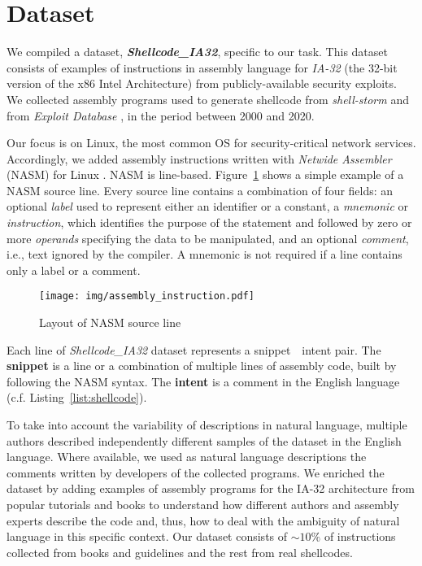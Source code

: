 \documentclass[11pt,a4paper]{article}
\newcommand{\datasetname}[1]{\emph{Shellcode\_IA32}}
\begin{document}
 
\section{Dataset}
\label{sec:dataset}
We compiled a dataset, \textbf{\datasetname{}}, specific to our task. This dataset consists of  examples of instructions in assembly language for \textit{IA-32} (the 32-bit version of the x86 Intel Architecture) from publicly-available security exploits. We collected assembly programs used to generate shellcode from \textit{shell-storm} \cite{shellstorm} and from \textit{Exploit Database} \cite{exploitdb}, in the period between 2000 and 2020.



Our focus is on Linux, the most common OS for security-critical network services. Accordingly, we added assembly instructions written with \textit{Netwide Assembler} (NASM) for Linux \cite{duntemann2000assembly}.
NASM is line-based. Figure~\ref{fig:assembly_instruction} shows a simple example of a NASM source line. Every source line contains a combination of four fields: an optional \textit{label} used to represent either an identifier or a constant, a \textit{mnemonic} or \textit{instruction}, which identifies the purpose of the statement and followed by zero or more \textit{operands} specifying the data to be manipulated, and an optional \textit{comment}, i.e., text ignored by the compiler. A mnemonic is not required if a line contains only a label or a comment. 
 
 \begin{figure}[h!]
    \centering
    \texttt{[image: img/assembly\_instruction.pdf]}
\caption{Layout of NASM source line}
    \label{fig:assembly_instruction}
\end{figure}

Each line of \datasetname{} dataset represents a snippet~\textendash~intent pair. The \textbf{snippet} is a line or a combination of multiple lines of assembly code, built by following the NASM syntax. The \textbf{intent} is a comment in the English language (c.f. Listing~\ref{list:shellcode}).

To take into account the variability of descriptions in natural language, multiple authors described independently different samples of the dataset in the English language. Where available, we used as natural language descriptions the comments written by developers of the collected programs. We enriched the dataset by adding examples of assembly programs for the IA-32 architecture from popular tutorials and books \cite{duntemann2011assembly, kusswurm2014modern, tutorialspoint} to understand how different authors and assembly experts describe the code and, thus, how to deal with the ambiguity of natural language in this specific context. 
Our dataset consists of $\sim10\%$ of instructions collected from books and guidelines and the rest from real shellcodes. 
\end{document}
